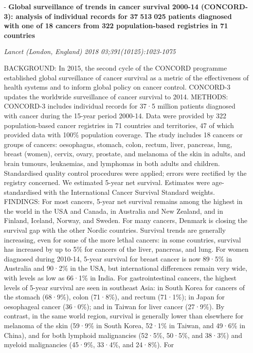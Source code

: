\documentclass[]{article}
\begin{document}
 - \textbf{Global surveillance of trends in cancer survival 2000-14
(CONCORD-3): analysis of individual records for 37 513 025 patients
diagnosed with one of 18 cancers from 322 population-based registries in
71 countries}

\emph{Lancet (London, England) 2018 03;391(10125):1023-1075}

BACKGROUND: In 2015, the second cycle of the CONCORD programme
established global surveillance of cancer survival as a metric of the
effectiveness of health systems and to inform global policy on cancer
control. CONCORD-3 updates the worldwide surveillance of cancer survival
to 2014. METHODS: CONCORD-3 includes individual records for 37·5 million
patients diagnosed with cancer during the 15-year period 2000-14. Data
were provided by 322 population-based cancer registries in 71 countries
and territories, 47 of which provided data with 100\% population
coverage. The study includes 18 cancers or groups of cancers:
oesophagus, stomach, colon, rectum, liver, pancreas, lung, breast
(women), cervix, ovary, prostate, and melanoma of the skin in adults,
and brain tumours, leukaemias, and lymphomas in both adults and
children. Standardised quality control procedures were applied; errors
were rectified by the registry concerned. We estimated 5-year net
survival. Estimates were age-standardised with the International Cancer
Survival Standard weights. FINDINGS: For most cancers, 5-year net
survival remains among the highest in the world in the USA and Canada,
in Australia and New Zealand, and in Finland, Iceland, Norway, and
Sweden. For many cancers, Denmark is closing the survival gap with the
other Nordic countries. Survival trends are generally increasing, even
for some of the more lethal cancers: in some countries, survival has
increased by up to 5\% for cancers of the liver, pancreas, and lung. For
women diagnosed during 2010-14, 5-year survival for breast cancer is now
89·5\% in Australia and 90·2\% in the USA, but international differences
remain very wide, with levels as low as 66·1\% in India. For
gastrointestinal cancers, the highest levels of 5-year survival are seen
in southeast Asia: in South Korea for cancers of the stomach (68·9\%),
colon (71·8\%), and rectum (71·1\%); in Japan for oesophageal cancer
(36·0\%); and in Taiwan for liver cancer (27·9\%). By contrast, in the
same world region, survival is generally lower than elsewhere for
melanoma of the skin (59·9\% in South Korea, 52·1\% in Taiwan, and
49·6\% in China), and for both lymphoid malignancies (52·5\%, 50·5\%,
and 38·3\%) and myeloid malignancies (45·9\%, 33·4\%, and 24·8\%). For
\end{document}
